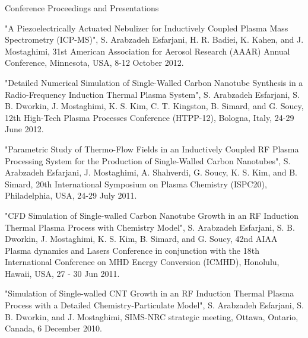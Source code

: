 \begin{cventries}
\cventry
{} %
{Conference Proceedings and Presentations} %
{} %
{} %
{ %
\vspace{-3 mm}
\begin{cvitems}
\item {"A Piezoelectrically Actuated Nebulizer for Inductively Coupled Plasma Mass Spectrometry
(ICP-MS)", S. Arabzadeh Esfarjani, H. R. Badiei, K. Kahen, and J. Mostaghimi, 31st American Association for Aerosol Research (AAAR) Annual Conference, Minnesota, USA, 8-12 October
2012.}
\item{"Detailed Numerical Simulation of Single-Walled Carbon Nanotube Synthesis in a Radio-Frequency Induction Thermal Plasma System", S. Arabzadeh Esfarjani, S. B. Dworkin, J. Mostaghimi, K. S. Kim, C. T. Kingston, B. Simard, and G. Soucy, 12th High-Tech Plasma Processes Conference (HTPP-12), Bologna, Italy, 24-29 June 2012.}
\item {"Parametric Study of Thermo-Flow Fields in an Inductively Coupled RF Plasma Processing
System for the Production of Single-Walled Carbon Nanotubes", S. Arabzadeh Esfarjani, J.
Mostaghimi, A. Shahverdi, G. Soucy, K. S. Kim, and B. Simard, 20th International Symposium
on Plasma Chemistry (ISPC20), Philadelphia, USA, 24-29 July 2011.}
\item{"CFD Simulation of Single-walled Carbon Nanotube Growth in an RF Induction Thermal Plasma Process with Chemistry Model", S. Arabzadeh Esfarjani, S. B. Dworkin, J. Mostaghimi, K. S. Kim, B. Simard, and G. Soucy, 42nd AIAA Plasma dynamics and Lasers Conference in conjunction with the 18th International Conference on MHD Energy Conversion (ICMHD), Honolulu, Hawaii, USA, 27 - 30 Jun 2011.}
\item{"Simulation of Single-walled CNT Growth in an RF Induction Thermal Plasma Process with
a Detailed Chemistry-Particulate Model", S. Arabzadeh Esfarjani, S. B. Dworkin, and J.
Mostaghimi, SIMS-NRC strategic meeting, Ottawa, Ontario, Canada, 6 December 2010.}
\end{cvitems}
}

\end{cventries}